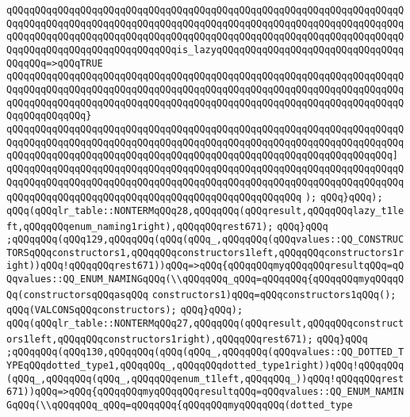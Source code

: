 \verb|qQQqqQQqqQQqqQQqqQQqqQQqqQQqqQQqqQQqqQQqqQQqqQQqqQQqqQQqqQQqqQQqqQQqqQQqqQQqqQQqqQQqqQQqqQQqqQQqqQQqqQQqqQQqqQQqqQQqqQQqqQQqqQQqqQQqqQQqqQQqqQQqqQQqqQQqqQQqqQQqqQQqqQQqqQQqqQQqqQQqqQQqqQQqqQQqqQQqqQQqqQQqqQQqqQQqqQQqqQQqqQQqqQQqqQQqqQQqqQQqis_lazyqQQqqQQqqQQqqQQqqQQqqQQqqQQqqQQqqQQqqQQq=>qQQqTRUE|\newline
\verb|qQQqqQQqqQQqqQQqqQQqqQQqqQQqqQQqqQQqqQQqqQQqqQQqqQQqqQQqqQQqqQQqqQQqqQQqqQQqqQQqqQQqqQQqqQQqqQQqqQQqqQQqqQQqqQQqqQQqqQQqqQQqqQQqqQQqqQQqqQQqqQQqqQQqqQQqqQQqqQQqqQQqqQQqqQQqqQQqqQQqqQQqqQQqqQQqqQQqqQQqqQQqqQQqqQQqqQQqqQQqqQQq}|\newline
\verb|qQQqqQQqqQQqqQQqqQQqqQQqqQQqqQQqqQQqqQQqqQQqqQQqqQQqqQQqqQQqqQQqqQQqqQQqqQQqqQQqqQQqqQQqqQQqqQQqqQQqqQQqqQQqqQQqqQQqqQQqqQQqqQQqqQQqqQQqqQQqqQQqqQQqqQQqqQQqqQQqqQQqqQQqqQQqqQQqqQQqqQQqqQQqqQQqqQQqqQQqqQQqqQQq]|\newline
\verb|qQQqqQQqqQQqqQQqqQQqqQQqqQQqqQQqqQQqqQQqqQQqqQQqqQQqqQQqqQQqqQQqqQQqqQQqqQQqqQQqqQQqqQQqqQQqqQQqqQQqqQQqqQQqqQQqqQQqqQQqqQQqqQQqqQQqqQQqqQQqqQQqqQQqqQQqqQQqqQQqqQQqqQQqqQQqqQQqqQQqqQQqqQQqqQQq|\newline
\verb|);|\newline
\verb|qQQq}qQQq);|\newline
\verb|qQQq(qQQqlr_table::NONTERMqQQq28,qQQqqQQq(qQQqresult,qQQqqQQqlazy_t1left,qQQqqQQqenum_naming1right),qQQqqQQqrest671);|\newline
\verb|qQQq}qQQq|\newline
\verb|;qQQqqQQq(qQQq129,qQQqqQQq(qQQq(qQQq_,qQQqqQQq(qQQqvalues::QQ_CONSTRUCTORSqQQqconstructors1,qQQqqQQqconstructors1left,qQQqqQQqconstructors1right))qQQq!qQQqqQQqrest671))qQQq=>qQQq{qQQqqQQqmyqQQqqQQqresultqQQq=qQQqvalues::QQ_ENUM_NAMINGqQQq(\\qQQqqQQq_qQQq=qQQqqQQq{qQQqqQQqmyqQQqqQQq(constructorsqQQqasqQQq|\newline
\verb|constructors1)qQQq=qQQqconstructors1qQQq();|\newline
\verb|qQQq(VALCONSqQQqconstructors);|\newline
\verb|qQQq}qQQq);|\newline
\verb|qQQq(qQQqlr_table::NONTERMqQQq27,qQQqqQQq(qQQqresult,qQQqqQQqconstructors1left,qQQqqQQqconstructors1right),qQQqqQQqrest671);|\newline
\verb|qQQq}qQQq|\newline
\verb|;qQQqqQQq(qQQq130,qQQqqQQq(qQQq(qQQq_,qQQqqQQq(qQQqvalues::QQ_DOTTED_TYPEqQQqdotted_type1,qQQqqQQq_,qQQqqQQqdotted_type1right))qQQq!qQQqqQQq(qQQq_,qQQqqQQq(qQQq_,qQQqqQQqenum_t1left,qQQqqQQq_))qQQq!qQQqqQQqrest671))qQQq=>qQQq{qQQqqQQqmyqQQqqQQqresultqQQq=qQQqvalues::QQ_ENUM_NAMINGqQQq(\\qQQqqQQq_qQQq=qQQqqQQq{qQQqqQQqmyqQQqqQQq(dotted_type|\newline
